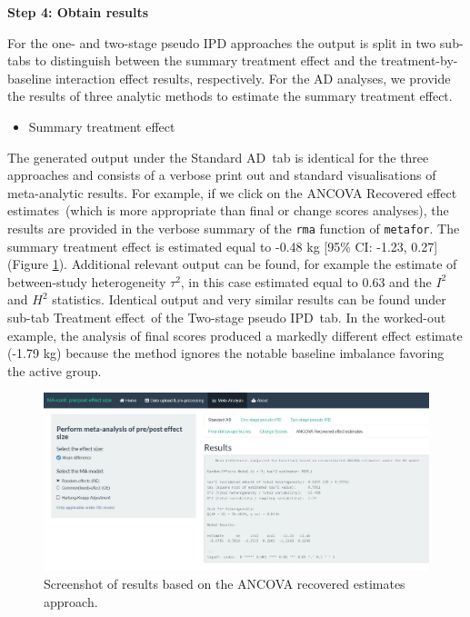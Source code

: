 \documentclass[AMA,STIX1COL]{WileyNJD-v2}
\begin{document}
\vspace{0.1cm}

\textbf{Step 4: Obtain results}
\vspace{0.1cm}

For the one- and two-stage pseudo IPD approaches the output is split in two sub-tabs to distinguish between the summary treatment effect and the treatment-by-baseline interaction effect results, respectively. For the AD analyses, we provide the results of three analytic methods to estimate the summary treatment effect.

\begin{itemize}
\item Summary treatment effect
\end{itemize}
The generated output under the \textquotesingle Standard AD\textquotesingle\ tab is identical for the three approaches and consists of a verbose print out and standard visualisations of meta-analytic results. For example, if we click on the \textquotesingle ANCOVA Recovered effect estimates\textquotesingle\ (which is more appropriate than final or change scores analyses), the results are provided in the verbose summary of the \texttt{rma} function of \texttt{metafor}. The summary treatment effect is estimated equal to -0.48 kg [95\% CI: -1.23, 0.27] (Figure \ref{fig:shiny-ancova_res}). Additional relevant output can be found, for example the estimate of between-study heterogeneity $\tau^2$, in this case estimated equal to 0.63 and the $I^2$ and $H^2$ statistics. Identical output and very similar results can be found under sub-tab \textquotesingle Treatment effect\textquotesingle\ of the \textquotesingle Two-stage pseudo IPD\textquotesingle\ tab. {\color{blue}In the worked-out example, the analysis of final scores produced a markedly different effect estimate (-1.79 kg) because the method ignores the notable baseline imbalance favoring the active group.
}

\begin{figure}[t]
  \centering \includegraphics[width=1.0\textwidth]{ANCOVA_res.JPG}
    \caption{\small {Screenshot of results based on the ANCOVA recovered estimates approach.}} \label{fig:shiny-ancova_res}
\end{figure}
\end{document}
